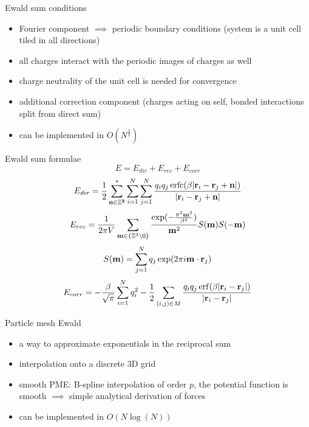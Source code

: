 \documentclass[11pt]{beamer}
\DeclareMathOperator\erf{erf}
\DeclareMathOperator\erfc{erfc}
\begin{document}
\begin{frame}{Ewald sum conditions}
\begin{itemize}
\item Fourier component $\implies$ periodic boundary conditions (system is a unit cell tiled in all directions)
\item all charges interact with the periodic images of charges as well
\item charge neutrality of the unit cell is needed for convergence
\item additional correction component (charges acting on self, bonded interactions split from direct sum)
\item can be implemented in $O(N^\frac{3}{2})$


\end{itemize}
\end{frame}

\begin{frame}{Ewald sum formulae}
\[E = E_{dir} + E_{rec} + E_{corr}\]
\[
E_{dir} = \frac{1}{2}\sum\limits_{\bold{n\in \mathbb{Z}^3}}^*\sum\limits_{i=1}^N\sum\limits_{j=1}^N\frac{q_i q_j \erfc(\beta\lvert\bold{r}_i - \bold{r}_j + \bold{n} \rvert)}{\lvert\bold{r}_i - \bold{r}_j + \bold{n} \rvert}
\]
\[
E_{rec}=\frac{1}{2\pi V}\sum\limits_{\bold{m} \in \{\mathbb{Z}^3 \setminus {0}\}}\frac{\exp(-\frac{\pi^2\bold{m}^2}{\beta^2})}{\bold{m}^2}S(\bold{m})S(\bold{-m})
\]
\[
 S(\bold{m}) = 
\sum\limits_{j=1}^Nq_j \exp(2\pi i\bold{m}\cdot\bold{r}_j)
\]
\[E_{corr} =  - \frac{\beta}{\sqrt{\pi}}\sum\limits_{i=1}^N q_i^2-\frac{1}{2}\sum\limits_{(i,j)\in M}\frac{q_i q_j \erf(\beta\lvert\bold{r}_i - \bold{r}_j\rvert)}{\lvert\bold{r}_i - \bold{r}_j\rvert}\]
\end{frame}

\begin{frame}{Particle mesh Ewald}
\begin{itemize}
\item a way to approximate exponentials in the reciprocal sum 
\item interpolation onto a discrete 3D grid
\item smooth PME: B-spline interpolation of order $p$, the potential function is smooth $\implies$ simple analytical derivation of forces
\item can be implemented in $O(N \log(N))$
\end{itemize}
\end{frame}
\end{document}
